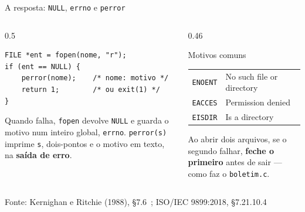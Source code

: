 \documentclass[aspectratio=169]{beamer}
\newcommand{\fonte}[1]{\vfill\hfill{\scriptsize\textcolor{UFSGray}{Fonte: #1}}}
\begin{document}
\begin{frame}[fragile]{A resposta: \texttt{NULL}, \texttt{errno} e \texttt{perror}}
  \vspace{-0.3em}
  \begin{columns}[T]
    \begin{column}{0.5\textwidth}
\begin{lstlisting}[style=codC]
FILE *ent = fopen(nome, "r");
if (ent == NULL) {
    perror(nome);    /* nome: motivo */
    return 1;        /* ou exit(1) */
}
\end{lstlisting}
      \small Quando falha, \texttt{fopen} devolve \texttt{NULL} e guarda o
      motivo num inteiro global, \texttt{errno}. \texttt{perror(s)} imprime
      \texttt{s}, dois-pontos e o motivo em texto, na \textbf{saída de
      erro}.
    \end{column}
    \begin{column}{0.46\textwidth}
      \begin{block}{Motivos comuns}
        \scriptsize
        \begin{tabular}{@{}ll@{}}
          \texttt{ENOENT} & No such file or directory\\
          \texttt{EACCES} & Permission denied\\
          \texttt{EISDIR} & Is a directory\\
        \end{tabular}
      \end{block}
      \small Ao abrir dois arquivos, se o segundo falhar,
      \textbf{feche o primeiro} antes de sair --- como faz o
      \texttt{boletim.c}.
    \end{column}
  \end{columns}
  \fonte{Kernighan e Ritchie (1988), §7.6~\cite{kernighan1988c};
    ISO/IEC 9899:2018, §7.21.10.4~\cite{iso2018c17}}
\end{frame}
\end{document}
